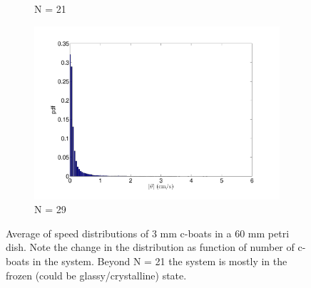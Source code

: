 \documentclass[12pt]{article}
\begin{document}
\begin{figure}[h!]
\begin{subfigure}[h!]{0.5\textwidth}
       \caption{N = 21}
       \label{fig:vpdf_21}
	\end{subfigure}
	\hfill
	\begin{subfigure}[h!]{0.5\textwidth}
    \centering
       \includegraphics[scale=0.28]{cb_29_3mm_60mm_v_pdf.pdf}
       \caption{N = 29}
       \label{fig:vpdf_29}
	\end{subfigure}
	\caption{Average of speed distributions of 3 mm c-boats in a 60 mm petri dish. Note the change in the distribution as function of number of c-boats in the system. Beyond N = 21 the system is mostly in the frozen (could be glassy/crystalline) state.}
	\label{fig:vpdfall}
\end{figure}
\end{document}

